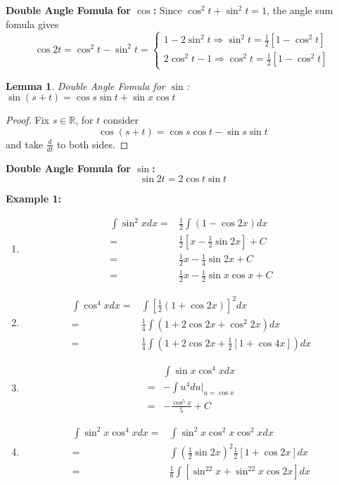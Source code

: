 \documentclass[12pt]{article}
\theoremstyle{plain}
\newtheorem{lemma}{Lemma}[subsection]
\newcommand{\mR}{{\mathbb{R}}}
\begin{document}
	\textbf{Double Angle Fomula for $\cos$: }
	Since $\cos^2 t + \sin^2 t = 1$, the angle sum fomula gives
	\[
		\cos 2t = \cos^2 t - \sin^2 t = 
		\begin{cases}
			1 - 2\sin^2 t \Rightarrow\sin^2 t = \frac12[1-\cos^2 t]\\
			2\cos^2 t - 1 \Rightarrow \cos^2 t = \frac12 [1-\cos^2 t]
		\end{cases}
	\]
	
	\begin{lemma}
		Double Angle Fomula for $\sin$: $\sin(s+t) = \cos s \sin t + \sin x
		\cos t$
	\end{lemma}
	\begin{proof}
		Fix $s \in \mR$, for $t$ consider
		\[
			\cos (s + t) = \cos s \cos t - \sin s \sin t
		\]
		and take $\frac d{dt}$ to both sides.
	\end{proof}

	\textbf{Double Angle Fomula for $\sin$: }
	\[
		\sin 2t = 2\cos t \sin t
	\]

	{\color{Brown}
		\textbf{Example 1:}
		\begin{enumerate}
		\item 
			\begin{align*}
				\int \sin^2x dx
				=& \frac12 \int(1-\cos 2x) dx\\
				=& \frac12 [x-\frac12 \sin 2x] + C\\
				=& \frac12 x - \frac 14 \sin 2x + C\\
				=& \frac12 x - \frac12 \sin x \cos x + C
			\end{align*}

		\item
			\begin{align*}
				\int \cos^4 x dx 
				=& \int[\frac12(1+\cos 2x)]^2 dx\\
				=& \frac 14 \int (1+ 2\cos 2x + \cos^2 2x) dx\\
				=& \frac 14 \int (1+2\cos 2x + \frac12[1+\cos4x]) dx
			\end{align*}

		\item 
			\begin{align*}
				&\int \sin x \cos^4 x dx \tag{$u = \cos x, du = -\sin xdx$}\\
				=& - \int u^4 du\vert_{u=\cos x} \\
				=& -\frac{\cos^5 x}5 + C
			\end{align*}
			
		\item
			\begin{align*}
				\int \sin^2x \cos^4 x dx
				=& \int \sin^2x\cos^2x\cos^2xdx\\
				=& \int (\frac12\sin2x)^2 \frac12[1+\cos 2x]dx\\
				=& \frac 18 \int[\sin^22x + \sin^22x\cos 2x] dx
			\end{align*}
		\end{enumerate}
	}
\end{document}
